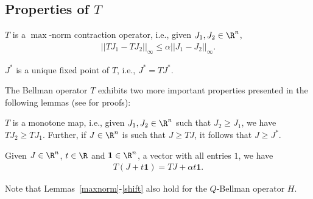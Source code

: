\subsection{Properties of $T$}
\begin{lemma}\label{maxnorm}
$T$ is a $\max$-norm contraction operator, i.e., given $J_1, J_2 \in \R^n$,
\begin{align}
||TJ_1-TJ_2||_\infty\leq \alpha ||J_1-J_2||_\infty.
\end{align}
\end{lemma}
\begin{corollary}\label{uniquesol}
$J^*$ is a unique fixed point of $T$, i.e., $J^*=TJ^*$.
\end{corollary}
The Bellman operator $T$ exhibits two more important properties presented in the following lemmas (see \cite{BertB} for proofs):
\begin{lemma}\label{monotone}
$T$ is a monotone map, i.e., given $J_1,J_2 \in \R^n$ such that $J_2\geq J_1$, we have $T J_2\geq T J_1$. Further, if $J\in \R^n$ is such that $J\geq TJ$, it follows that $J\geq J^*$.
\end{lemma}
\begin{lemma}\label{shift}
Given $J\in \R^n$, $t \in \R$ and $\mathbf{1} \in \R^n$, a vector with all entries $1$, we have
\begin{align}
T(J+t\mathbf{1})=TJ+\alpha t\mathbf{1}.
\end{align}
\end{lemma}
Note that Lemmas~\ref{maxnorm}-\ref{shift} also hold for the $Q$-Bellman operator $H$.
